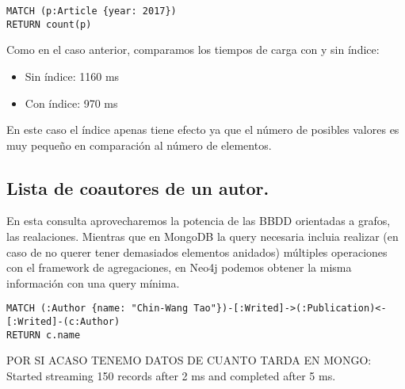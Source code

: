 \begin{verbatim}
MATCH (p:Article {year: 2017})
RETURN count(p)
\end{verbatim}

Como en el caso anterior, comparamos los tiempos de carga con y sin índice:

\begin{itemize}
 \item Sin índice: 1160 ms
 \item Con índice: 970 ms
\end{itemize}

En este caso el índice apenas tiene efecto ya que el número de posibles valores es muy pequeño en comparación al número de elementos.

\subsection{Lista de coautores de un autor.}

En esta consulta aprovecharemos la potencia de las \gls{BBDD} orientadas a grafos, las realaciones. Mientras que en MongoDB la query necesaria incluia realizar (en caso de no querer tener demasiados elementos anidados) múltiples operaciones con el framework de agregaciones, en Neo4j podemos obtener la misma información con una query mínima. 

\begin{verbatim}
MATCH (:Author {name: "Chin-Wang Tao"})-[:Writed]->(:Publication)<-[:Writed]-(c:Author)
RETURN c.name
\end{verbatim}

POR SI ACASO TENEMO DATOS DE CUANTO TARDA EN MONGO:
Started streaming 150 records after 2 ms and completed after 5 ms.

